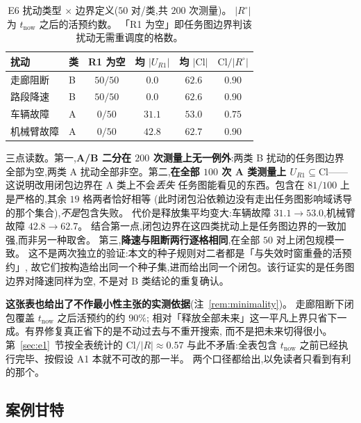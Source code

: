 \documentclass[manuscript,screen,review]{acmart}
\newcommand{\NPairs}{50}
\newcommand{\StrictlyLarger}{81/100}
\newcommand{\ClosureAliveFrac}{90\%}
\begin{document}
\begin{table}[t]
\centering
\caption{E6 扰动类型 \(\times\) 边界定义(\(\NPairs\) 对/类,共 \(200\) 次测量)。
\(|R^{\circ}|\) 为 \(t_{\mathrm{now}}\) 之后的活预约数。
「R1 为空」即任务图边界判该扰动无需重调度的格数。}
\label{tab:e6}
\small
\begin{tabular}{@{}llcccc@{}}
\toprule
扰动 & 类 & R1 为空 & 均 \(|U_{R1}|\) & 均 \(|\mathrm{Cl}|\)
 & \(\mathrm{Cl}/|R^{\circ}|\) \\
\midrule
走廊阻断   & B & \(50/50\) & \(0.0\)  & \(62.6\) & \(0.90\) \\
路段降速   & B & \(50/50\) & \(0.0\)  & \(62.6\) & \(0.90\) \\
车辆故障   & A & \(0/50\)  & \(31.1\) & \(53.0\) & \(0.75\) \\
机械臂故障 & A & \(0/50\)  & \(42.8\) & \(62.7\) & \(0.90\) \\
\bottomrule
\end{tabular}
\end{table}

三点读数。第一,\textbf{A/B 二分在 \(200\) 次测量上无一例外}:两类 B 扰动的任务图边界
全部为空,两类 A 扰动全部非空。第二,\textbf{在全部 \(100\) 次 A 类测量上
\(U_{R1}\subseteq\mathrm{Cl}\)}——这说明改用闭包边界在 A 类上不会\emph{丢失}
任务图能看见的东西。包含在 \(\StrictlyLarger\) 上是严格的,其余 \(19\) 格两者恰好相等
(此时闭包沿依赖边没有走出任务图影响域诱导的那个集合),\emph{不是}包含失败。
代价是释放集平均变大:车辆故障 \(31.1\to 53.0\),机械臂故障 \(42.8\to 62.7\)。
结合第一点,闭包边界在这四类扰动上是任务图边界的一致加强,而非另一种取舍。
第三,\textbf{降速与阻断两行逐格相同},在全部 \(50\) 对上闭包规模一致。
这不是两次独立的验证:本文的种子规则对二者都是「与失效时窗重叠的活预约」,
故它们按构造给出同一个种子集,进而给出同一个闭包。该行证实的是任务图边界对降速同样为空,
不是对 B 类结论的重复确认。

\textbf{这张表也给出了不作最小性主张的实测依据}(注~\ref{rem:minimality})。
走廊阻断下闭包覆盖 \(t_{\mathrm{now}}\) 之后活预约的约 \(\ClosureAliveFrac\);
相对「释放全部未来」这一平凡上界只省下一成。有界修复真正省下的是不动过去与不重开搜索,
而不是把未来切得很小。第~\ref{sec:e1}~节按全表统计的 \(\mathrm{Cl}/|R|\approx 0.57\)
与此不矛盾:全表包含 \(t_{\mathrm{now}}\) 之前已经执行完毕、按假设 A1 本就不可改的那一半。
两个口径都给出,以免读者只看到有利的那个。

\subsection{案例甘特}
\label{sec:case}
\end{document}
